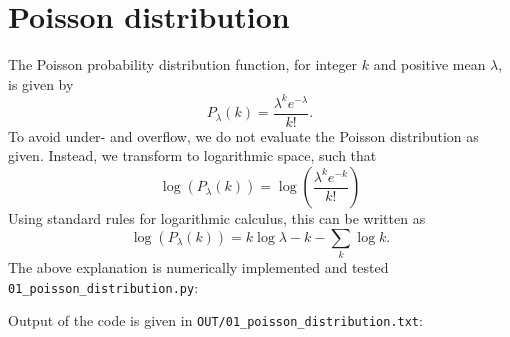 \section{Poisson distribution}
The Poisson probability distribution function, for integer $k$ and positive mean $\lambda$, is given by
\begin{equation}
	P_\lambda(k) = \frac{\lambda^k e^{-\lambda}}{k!}.
\end{equation}
To avoid under- and overflow, we do not evaluate the Poisson distribution as given. Instead, we transform to logarithmic space, such that
\begin{equation}
	\log\left(P_\lambda(k)\right) = \log\left(\frac{\lambda^k e^{-k}}{k!}\right)
\end{equation}
Using standard rules for logarithmic calculus, this can be written as
\begin{equation}
	\log\left(P_\lambda(k)\right) = k\log{\lambda} - k - \sum_k \log{k}.
\end{equation}
The above explanation is numerically implemented and tested \texttt{01\_poisson\_distribution.py}:



Output of the code is given in \texttt{OUT/01\_poisson\_distribution.txt}:


